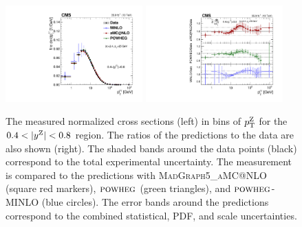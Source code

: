 \begin{figure}
	\centering
	\includegraphics[width=0.47\textwidth]{figures/zpt/zll_double_normrap1.pdf}
        \includegraphics[width=0.47\textwidth]{figures/zpt/zll_double_ratio_normrap1.pdf}
	\caption{The measured normalized cross sections (left) in bins of $p_{\mathrm{T}}^{\mathrm{Z}}$ for the $0.4 < |y^{\mathrm{Z}}| < 0.8$ region. The ratios of the predictions to the data are also shown (right). The shaded bands around the data points (black) correspond to the total experimental uncertainty. The measurement is compared to the predictions with \textsc{MadGraph5\_aMC@NLO} (square red markers),  ${\textsc{powheg}}$ (green triangles), and ${\textsc{powheg}}$-\textsc{MINLO} (blue circles). The error bands around the predictions correspond to the combined statistical, PDF, and scale uncertainties.}
	\label{fig:zll_norm1}
\end{figure}


